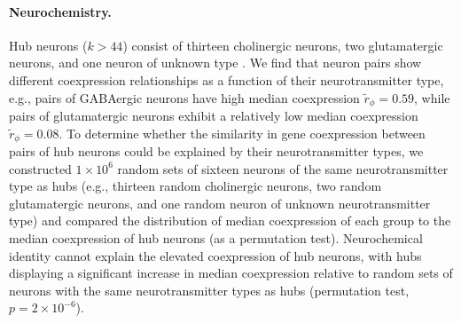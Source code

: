 \documentclass[10pt,letterpaper]{article}
\begin{document}
{%




\paragraph{Neurochemistry.}
Hub neurons ($k > 44$) consist of thirteen cholinergic neurons, two glutamatergic neurons, and one neuron of unknown type \cite{Pereira:2015er}.
We find that neuron pairs show different coexpression relationships as a function of their neurotransmitter type, e.g., pairs of GABAergic neurons have high median coexpression $\tilde{r}_\phi = 0.59$, while pairs of glutamatergic neurons exhibit a relatively low median coexpression $\tilde{r}_\phi = 0.08$.
To determine whether the similarity in gene coexpression between pairs of hub neurons could be explained by their neurotransmitter types, we constructed $1\times 10^6$ random sets of sixteen neurons of the same neurotransmitter type as hubs (e.g., thirteen random cholinergic neurons, two random glutamatergic neurons, and one random neuron of unknown neurotransmitter type) and compared the distribution of median coexpression of each group to the median coexpression of hub neurons (as a permutation test).
Neurochemical identity cannot explain the elevated coexpression of hub neurons, with hubs displaying a significant increase in median coexpression relative to random sets of neurons with the same neurotransmitter types as hubs (permutation test, $p = 2\times 10^{-6}$).

}
\end{document}
